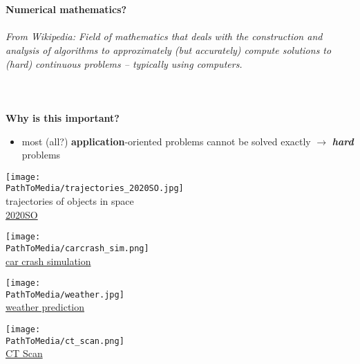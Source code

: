 %
\begin{frame}
	~\\
	~\\
	\textbf{Numerical mathematics?}\\~\\
	\textit{From Wikipedia: Field of mathematics that deals with the construction and analysis of algorithms to approximately (but accurately) compute solutions to (hard) continuous problems -- typically using computers.}
	~\\~\\~\\~\\
	\textbf{Why is this important?}~\\
	\begin{itemize}
		\item most (all?) \textbf{application}-oriented problems cannot be solved exactly $\rightarrow$ \textit{\textbf{hard}} problems \vspace{0.3cm}
	\end{itemize}
	\begin{minipage}[t]{0.25\textwidth}\centering
		\texttt{[image: \\PathToMedia/trajectories\_2020SO.jpg]}\\
		trajectories of objects in space \\
		\hyperref{https://en.wikipedia.org/wiki/2020_SO\#/media/File:2020SO_b.gif}{}{}{2020SO} 
	\end{minipage}
	\begin{minipage}[t]{0.25\textwidth}\centering
		\texttt{[image: \\PathToMedia/carcrash\_sim.png]}\\
		\hyperref{https://www.emi.fraunhofer.de/de/geschaeftsfelder/automotive/forschung/archiv/Roentgen-Crashtest.html}{}{}{car crash simulation} 
	\end{minipage}
	\begin{minipage}[t]{0.25\textwidth}\centering
		\texttt{[image: \\PathToMedia/weather.jpg]}\\
		\hyperref{https://en.wikipedia.org/wiki/Numerical_weather_prediction}{}{}{weather prediction} 
	\end{minipage}
	\begin{minipage}[t]{0.25\textwidth} \centering
		\texttt{[image: \\PathToMedia/ct\_scan.png]}\\
		\hyperref{https://en.wikipedia.org/wiki/CT_scan}{}{}{CT Scan} 
	\end{minipage}
\end{frame}

